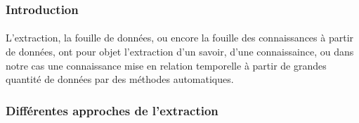 \documentclass[12pt,a4	]{report}
\begin{document}
\subsubsection*{Introduction}
\paragraph{}
L'extraction, la fouille de données, ou encore la fouille des connaissances à partir de données, ont pour  objet l'extraction d'un savoir, d'une connaissaince, ou dans notre cas une connaissance mise en relation temporelle à partir de grandes quantité de données par des méthodes automatiques.
\subsubsection*{Différentes approches de l'extraction }
\end{document}

